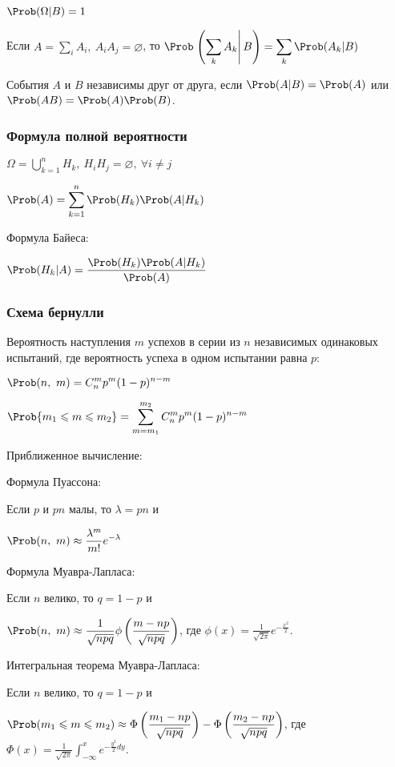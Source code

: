 $\displaystyle \Prob(\Omega|B) = 1 $

Если $\displaystyle A = \sum_{i} A_i,\ A_i A_j = \varnothing $, то $\displaystyle \Prob\left.\left(\sum_k A_k\right|B\right) = \sum_k \Prob(A_k|B) $

События $A$ и $B$ независимы друг от друга, если $\Prob(A|B) = \Prob(A)$ или $\Prob(AB) = \Prob(A)\Prob(B)$.

\subsubsection{Формула полной вероятности}

$\displaystyle \Omega = \bigcup_{k=1}^n H_k,\ H_i H_j = \varnothing,\ \forall i \neq j $

$\displaystyle \Prob(A) = \sum_{k=1}^{n} \Prob(H_k) \Prob(A|H_k) $

Формула Байеса:

$\displaystyle \Prob(H_k|A) = \frac{\Prob(H_k)\Prob(A|H_k)}{\Prob(A)} $

\subsubsection{Схема бернулли}

Вероятность наступления $m$ успехов в серии из $n$ независимых одинаковых испытаний, где вероятность успеха в одном испытании равна $p$:

$\displaystyle \Prob(n,\ m) = C_n^m p^m (1-p)^{n-m} $

$\displaystyle \Prob\{m_1 \leqslant m \leqslant m_2\} = \sum_{m=m_1}^{m_2} C_n^m p^m (1-p)^{n-m} $

Приближенное вычисление:

Формула Пуассона:

Если $p$ и $pn$ малы, то $\lambda = pn$ и 

$\displaystyle \Prob(n,\ m) \approx \frac{\lambda^m}{m!}e^{-\lambda} $ 

Формула Муавра-Лапласа:

Если $n$ велико, то $q = 1 - p$ и

$\displaystyle \Prob(n,\ m) \approx \frac{1}{\sqrt{npq}}\phi\left(\frac{m-np}{\sqrt{npq}}\right) $, где $\phi(x) = \frac{1}{\sqrt{2\pi}} e^{-\frac{x^2}{2}}$.

Интегральная теорема Муавра-Лапласа:

Если $n$ велико, то $q = 1 - p$ и

$\displaystyle \Prob(m_1 \leqslant m \leqslant m_2) \approx \Phi\left(\frac{m_1 - np}{\sqrt{npq}}\right) - \Phi\left(\frac{m_2 - np}{\sqrt{npq}}\right) $, где $\Phi(x) = \frac{1}{\sqrt{2\pi}} \int_{-\infty}^{x} e^{-\frac{y^2}{2} dy} $.


